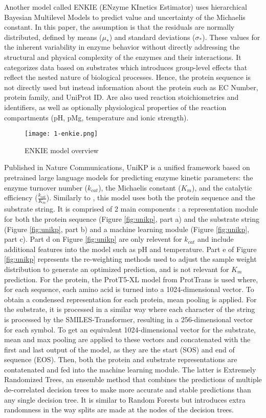 Another model called ENKIE (ENzyme KInetics Estimator) uses hierarchical Bayesian Multilevel Models to predict value and uncertainty of the Michaelis constant. In this paper, the assumption is that the residuals are normally distributed, defined by means ($\mu_*$) and standard deviations ($\sigma_*$). These values for the inherent variability in enzyme behavior without directly addressing the structural and physical complexity of the enzymes and their interactions. It categorizes data based on substrates which introduces group-level effects that reflect the nested nature of biological processes. Hence, the protein sequence is not directly used but instead information about the protein such as EC Number, protein family, and UniProt ID. Are also used reaction stoichiometries and identifiers, as well as optionally physiological properties of the reaction compartments (pH, pMg, 
temperature and ionic strength).

\begin{figure}
  \centering
  \texttt{[image: 1-enkie.png]}
  \caption{ENKIE model overview}
  \label{fig:enkie}
\end{figure}

Published in Nature Communications, UniKP is a unified framework based on pretrained large language models for predicting enzyme kinetic parameters: the enzyme turnover number ($k_{cat}$), the Michaelis constant ($K_m$), and the catalytic efficiency ($\frac{k_{cat}}{K_m}$). Similarly to \citeauthor{km1}, this model uses both the protein sequence and the substrate string. It is comprised of 2 main components : a representation module for both the protein sequence (Figure \ref{fig:unikp}, part a) and the substrate string (Figure \ref{fig:unikp}, part b) and a machine learning module (Figure \ref{fig:unikp}, part c). Part d on Figure \ref{fig:unikp} are only relevent for $k_{cat}$ and include additional features into the model such as pH and temperature. Part e of Figure \ref{fig:unikp} represents the re-weighting methods used to adjust the sample weight distribution to generate an optimized prediction, and is not relevant for $K_m$ prediction. For the protein, the ProtT5-XL model from ProtTrans is used where, for each sequence, each amino acid is turned into a 1024-dimensional vector. \cite{prottrans} To obtain a condensed representation for each protein, mean pooling is applied. For the substrate, it is processed in a similar way where each character of the string is processed by the SMILES-Transformer, resulting in a 256-dimensional vector for each symbol. \cite{smiles-transformer} To get an equivalent 1024-dimensional vector for the substrate, mean and max pooling are applied to these vectors and concatenated with the first and last output of the model, as they are the start (SOS) and end of sequence (EOS). Then, both the protein and substrate representations are contatenated and fed into the machine learning module. The latter is Extremely Randomized Trees, an ensemble method that combines the predictions of multiple de-correlated decision trees to make more accurate and stable predictions than any single decision tree. It is similar to Random Forests but introduces extra randomness in the way splits are made at the nodes of the decision trees. \cite{extratrees}

